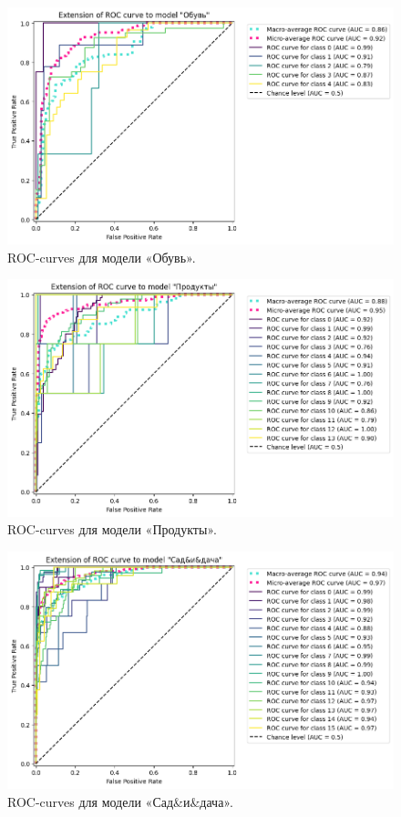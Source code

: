 \documentclass[a4paper,12pt]{extarticle}
\begin{document}
\begin{figure}[hbtp]
	\centering
	\includegraphics[scale=0.7]{roc_curves/roccurve_Обувь.png}
	\caption{ROC-curves для модели «Обувь».}
	\label{fig:roccurve_Обувь}
\end{figure}

\begin{figure}[hbtp]
	\centering
	\includegraphics[scale=0.7]{roc_curves/roccurve_Продукты.png}
	\caption{ROC-curves для модели «Продукты».}
	\label{fig:roccurve_Продукты}
\end{figure}

\begin{figure}[hbtp]
	\centering
	\includegraphics[scale=0.7]{roc_curves/roccurve_Сад&и&дача.png}
	\caption{ROC-curves для модели «Сад\&и\&дача».}
	\label{fig:roccurve_Сад&и&дача}
\end{figure}
\end{document}
